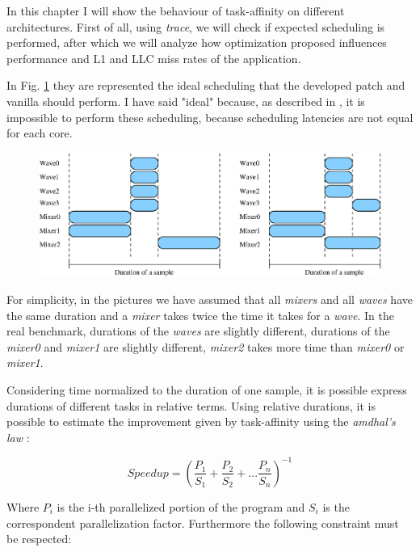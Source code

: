 In this chapter I will show the behaviour of task-affinity on different architectures. First of all, using \textit{trace}, we will check if expected 
scheduling is performed, after which we will analyze how optimization proposed influences performance and L1 and LLC miss rates of the application. 

In Fig. \ref{fig:ideal_scheduling} they are represented the ideal scheduling that the developed patch and vanilla should perform. 
I have said "ideal" because, as described in \cite{lcs}, it is impossible to perform these scheduling, because scheduling latencies are not equal for each 
core.

\begin{figure}[htbp]
\centering
\includegraphics[width=\widefigure]{images/schedule_van_taskaff.eps}
\caption{}
\label{fig:ideal_scheduling}
\end{figure}

For simplicity, in the pictures we have assumed that all \textit{mixers} and all \textit{waves} have the same duration and a \textit{mixer} takes twice the 
time it takes for a \textit{wave}. In the real benchmark, durations of the \textit{waves} are slightly different, durations of the \textit{mixer0} and 
\textit{mixer1} are slightly different, \textit{mixer2} takes more time than \textit{mixer0} or \textit{mixer1}.

Considering time normalized to the duration of one sample, it is possible express durations of different tasks in relative terms.
Using relative durations, it is possible to estimate the improvement given by task-affinity using the \textit{amdhal's law} \cite{lcs}:

\begin{equation}
       Speedup = \left(\frac{P_{1}}{S_{1}} + \frac{P_{2}}{S_{2}} + ... \frac{P_{n}}{S_{n}} \right)^{-1} 
\label{eq:amdhal}
\end{equation}

Where $P_{i}$ is the i-th parallelized portion of the program and $S_{i}$ is the correspondent parallelization factor. Furthermore the following constraint 
must be respected:

